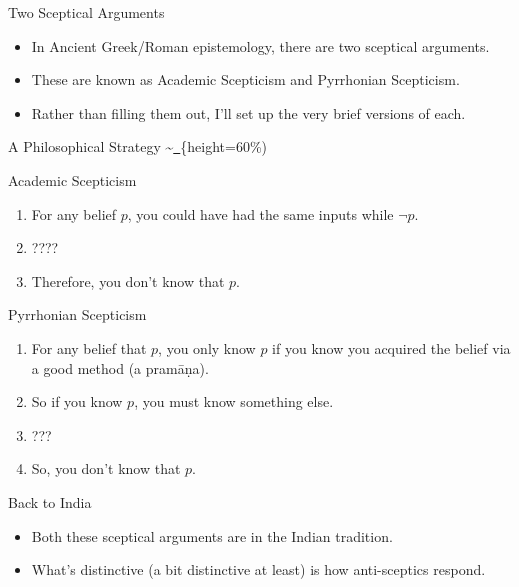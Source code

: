 \documentclass[
  17pt,
  letterpaper,
  ignorenonframetext,
  aspectratio=169,
]{beamer}
\providecommand{\tightlist}{%
  \setlength{\itemsep}{0pt}\setlength{\parskip}{0pt}}\usepackage{longtable,booktabs,array}
\begin{document}
\begin{frame}{Two Sceptical Arguments}
\protect\hypertarget{two-sceptical-arguments}{}
\begin{itemize}[<+->]
\tightlist
\item
  In Ancient Greek/Roman epistemology, there are two sceptical
  arguments.
\item
  These are known as Academic Scepticism and Pyrrhonian Scepticism.
\item
  Rather than filling them out, I'll set up the very brief versions of
  each.
\end{itemize}
\end{frame}

\begin{frame}{A Philosophical Strategy}
\protect\hypertarget{a-philosophical-strategy}{}
\textasciitilde{}\href{../images/underpants.jpeg}{~}\{height=60\%)
\end{frame}

\begin{frame}{Academic Scepticism}
\protect\hypertarget{academic-scepticism}{}
\begin{enumerate}[<+->]
\tightlist
\item
  For any belief \(p\), you could have had the same inputs while
  \(\neg p\).
\item
  ????
\item
  Therefore, you don't know that \(p\).
\end{enumerate}
\end{frame}

\begin{frame}{Pyrrhonian Scepticism}
\protect\hypertarget{pyrrhonian-scepticism}{}
\begin{enumerate}[<+->]
\tightlist
\item
  For any belief that \(p\), you only know \(p\) if you know you
  acquired the belief via a good method (a pramāṇa).
\item
  So if you know \(p\), you must know something else.
\item
  ???
\item
  So, you don't know that \(p\).
\end{enumerate}
\end{frame}

\begin{frame}{Back to India}
\protect\hypertarget{back-to-india}{}
\begin{itemize}[<+->]
\tightlist
\item
  Both these sceptical arguments are in the Indian tradition.
\item
  What's distinctive (a bit distinctive at least) is how anti-sceptics
  respond.
\end{itemize}
\end{frame}
\end{document}
